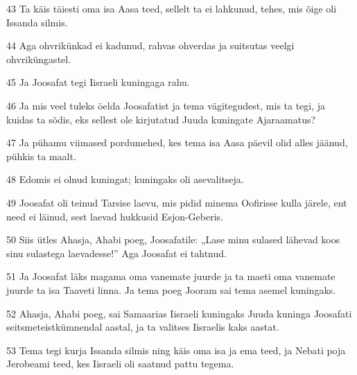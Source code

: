 \par 43 Ta käis täiesti oma isa Aasa teed, sellelt ta ei lahkunud, tehes, mis õige oli Issanda silmis.
\par 44 Aga ohvrikünkad ei kadunud, rahvas ohverdas ja suitsutas veelgi ohvriküngastel.
\par 45 Ja Joosafat tegi Iisraeli kuningaga rahu.
\par 46 Ja mis veel tuleks öelda Joosafatist ja tema vägitegudest, mis ta tegi, ja kuidas ta sõdis, eks sellest ole kirjutatud Juuda kuningate Ajaraamatus?
\par 47 Ja pühamu viimased pordumehed, kes tema isa Aasa päevil olid alles jäänud, pühkis ta maalt.
\par 48 Edomis ei olnud kuningat; kuningaks oli asevalitseja.
\par 49 Joosafat oli teinud Tarsise laevu, mis pidid minema Oofirisse kulla järele, ent need ei läinud, sest laevad hukkusid Esjon-Geberis.
\par 50 Siis ütles Ahasja, Ahabi poeg, Joosafatile: „Lase minu sulased lähevad koos sinu sulastega laevadesse!” Aga Joosafat ei tahtnud.
\par 51 Ja Joosafat läks magama oma vanemate juurde ja ta maeti oma vanemate juurde ta isa Taaveti linna. Ja tema poeg Jooram sai tema asemel kuningaks.
\par 52 Ahasja, Ahabi poeg, sai Samaarias Iisraeli kuningaks Juuda kuninga Joosafati seitsmeteistkümnendal aastal, ja ta valitses Iisraelis kaks aastat.
\par 53 Tema tegi kurja Issanda silmis ning käis oma isa ja ema teed, ja Nebati poja Jerobeami teed, kes Iisraeli oli saatnud pattu tegema.



